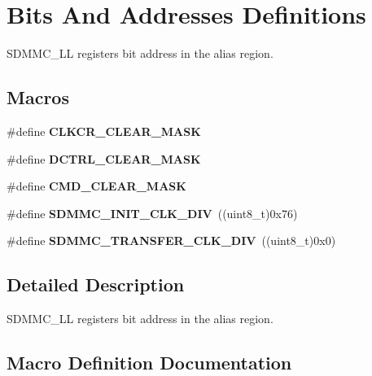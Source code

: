 \hypertarget{group___s_d_m_m_c___l_l___register}{}\section{Bits And Addresses Definitions}
\label{group___s_d_m_m_c___l_l___register}


S\+D\+M\+M\+C\+\_\+\+LL registers bit address in the alias region.  


\subsection*{Macros}
\begin{DoxyCompactItemize}
\item 
\#define {\bfseries C\+L\+K\+C\+R\+\_\+\+C\+L\+E\+A\+R\+\_\+\+M\+A\+SK}
\item 
\#define {\bfseries D\+C\+T\+R\+L\+\_\+\+C\+L\+E\+A\+R\+\_\+\+M\+A\+SK}
\item 
\#define {\bfseries C\+M\+D\+\_\+\+C\+L\+E\+A\+R\+\_\+\+M\+A\+SK}
\item 
\mbox{\label{group___s_d_m_m_c___l_l___register_gab3ae3e809aeb9833ca29bfe71a237db2}} 
\#define {\bfseries S\+D\+M\+M\+C\+\_\+\+I\+N\+I\+T\+\_\+\+C\+L\+K\+\_\+\+D\+IV}~((uint8\+\_\+t)0x76)
\item 
\mbox{\label{group___s_d_m_m_c___l_l___register_ga6d9cf084f4a70a50f4b1d1010984214d}} 
\#define {\bfseries S\+D\+M\+M\+C\+\_\+\+T\+R\+A\+N\+S\+F\+E\+R\+\_\+\+C\+L\+K\+\_\+\+D\+IV}~((uint8\+\_\+t)0x0)
\end{DoxyCompactItemize}


\subsection{Detailed Description}
S\+D\+M\+M\+C\+\_\+\+LL registers bit address in the alias region. 



\subsection{Macro Definition Documentation}
\mbox{\label{group___s_d_m_m_c___l_l___register_gac8d10dd1e49ca9e8a6954146654e9a01}} 
